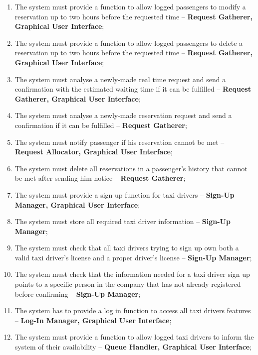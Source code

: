 \begin{enumerate}
\item The system must provide a function to allow logged passengers to modify a reservation up to two hours before the requested time -- \textbf{Request Gatherer, Graphical User Interface};
\item The system must provide a function to allow logged passengers to delete a reservation up to two hours before the requested time -- \textbf{Request Gatherer, Graphical User Interface};

\item The system must analyse a newly-made real time request and send a confirmation with the estimated waiting time if it can be fulfilled -- \textbf{Request Gatherer, Graphical User Interface};
\item The system must analyse a newly-made reservation request and send a confirmation if it can be fulfilled -- \textbf{Request Gatherer};

\item The system must notify passenger if his reservation cannot be met -- \textbf{Request Allocator, Graphical User Interface};
\item The system must delete all reservations in a passenger's history that cannot be met after sending him notice -- \textbf{Request Gatherer};

\item The system must provide a sign up function for taxi drivers -- \textbf{Sign-Up Manager, Graphical User Interface};
\item The system must store all required taxi driver information -- \textbf{Sign-Up Manager};
\item The system must check that all taxi drivers trying to sign up own both a valid taxi driver's license and a proper driver's license -- \textbf{Sign-Up Manager};
\item The system must check that the information needed for a taxi driver sign up points to a specific person in the company that has not already registered before confirming -- \textbf{Sign-Up Manager};

\item The system has to provide a log in function to access all taxi drivers features -- \textbf{Log-In Manager, Graphical User Interface};

\item The system must provide a function to allow logged taxi drivers to inform the system of their availability -- \textbf{Queue Handler, Graphical User Interface};


\end{enumerate}
